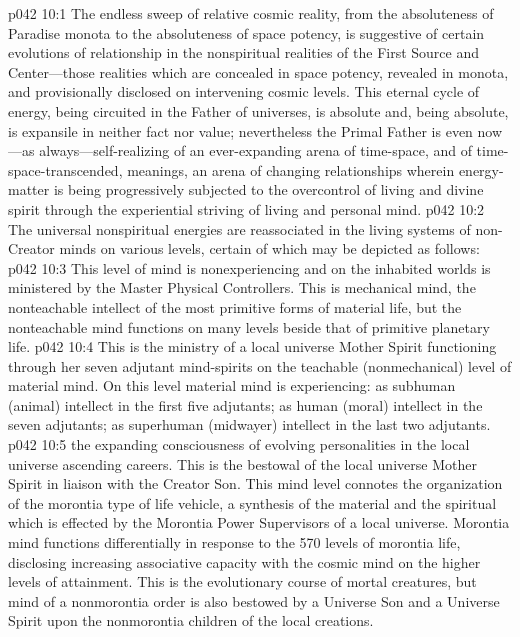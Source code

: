\vs p042 10:1 The endless sweep of relative cosmic reality, from the absoluteness of Paradise monota to the absoluteness of space potency, is suggestive of certain evolutions of relationship in the nonspiritual realities of the First Source and Center---those realities which are concealed in space potency, revealed in monota, and provisionally disclosed on intervening cosmic levels. This eternal cycle of energy, being circuited in the Father of universes, is absolute and, being absolute, is expansile in neither fact nor value; nevertheless the Primal Father is even now---as always---self\hyp{}realizing of an ever\hyp{}expanding arena of time\hyp{}space, and of time\hyp{}space\hyp{}transcended, meanings, an arena of changing relationships wherein energy\hyp{}matter is being progressively subjected to the overcontrol of living and divine spirit through the experiential striving of living and personal mind.
\vs p042 10:2 The universal nonspiritual energies are reassociated in the living systems of non\hyp{}Creator minds on various levels, certain of which may be depicted as follows:
\pc \vs p042 10:3 \bibnobreakspace {} This level of mind is nonexperiencing and on the inhabited worlds is ministered by the Master Physical Controllers. This is mechanical mind, the nonteachable intellect of the most primitive forms of material life, but the nonteachable mind functions on many levels beside that of primitive planetary life.
\pc \vs p042 10:4 \bibnobreakspace {} This is the ministry of a local universe Mother Spirit functioning through her seven adjutant mind\hyp{}spirits on the teachable (nonmechanical) level of material mind. On this level material mind is experiencing: as subhuman (animal) intellect in the first five adjutants; as human (moral) intellect in the seven adjutants; as superhuman (midwayer) intellect in the last two adjutants.
\pc \vs p042 10:5 \bibnobreakspace {}the expanding consciousness of evolving personalities in the local universe ascending careers. This is the bestowal of the local universe Mother Spirit in liaison with the Creator Son. This mind level connotes the organization of the morontia type of life vehicle, a synthesis of the material and the spiritual which is effected by the Morontia Power Supervisors of a local universe. Morontia mind functions differentially in response to the 570 levels of morontia life, disclosing increasing associative capacity with the cosmic mind on the higher levels of attainment. This is the evolutionary course of mortal creatures, but mind of a nonmorontia order is also bestowed by a Universe Son and a Universe Spirit upon the nonmorontia children of the local creations.\plusone
